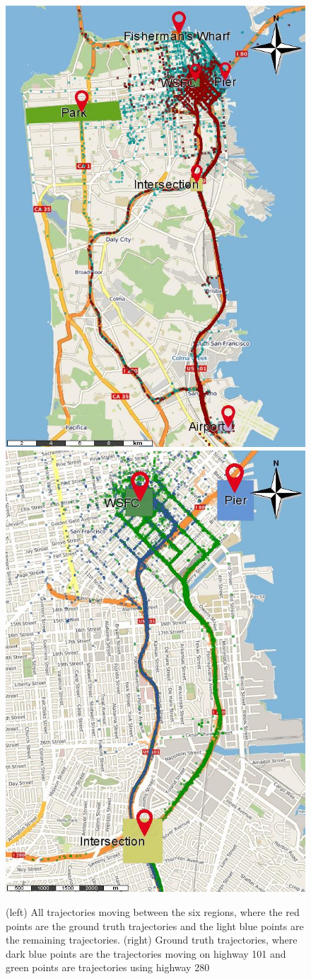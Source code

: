 \documentclass[12pt]{article}
\begin{document}
\begin{figure}[ht!]
\centering
\includegraphics[width=.45\textwidth]{Images/new_CRAWDAD-Trajectories-Painted}
\includegraphics[width=.45\textwidth]{Images/new_CRAWDAD-Paths-Painted}
\caption{(left) All trajectories moving between the six regions, where the red points are the ground truth trajectories and the light blue points are the remaining trajectories. (right) Ground truth trajectories, where dark blue points are the trajectories moving on highway 101 and green points are trajectories using highway 280}
\label{fig:new_sanfrancisco_map_rois}
\end{figure}

\end{document}
